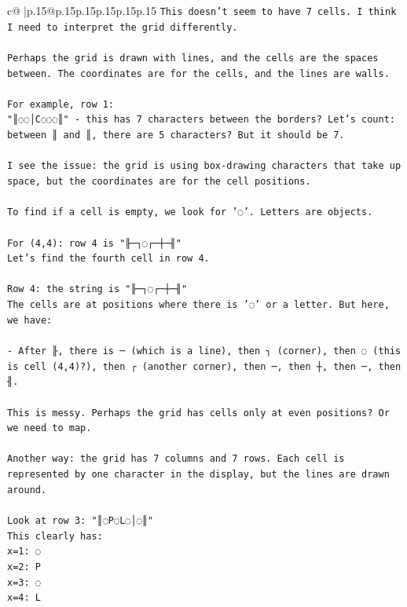 \documentclass{article}
\begin{document}
{\begin{supertabular}{c@{$\;$}|p{.15\linewidth}@{}p{.15\linewidth}p{.15\linewidth}p{.15\linewidth}p{.15\linewidth}p{.15\linewidth}}
{{{\texttt{This doesn't seem to have 7 cells. I think I need to interpret the grid differently.} \\
\\ 
\texttt{Perhaps the grid is drawn with lines, and the cells are the spaces between. The coordinates are for the cells, and the lines are walls.} \\
\\ 
\texttt{For example, row 1: } \\
\texttt{"║◌◌│C◌◌◌║" {-} this has 7 characters between the borders? Let's count: between ║ and ║, there are 5 characters? But it should be 7.} \\
\\ 
\texttt{I see the issue: the grid is using box{-}drawing characters that take up space, but the coordinates are for the cell positions.} \\
\\ 
\texttt{To find if a cell is empty, we look for '◌'. Letters are objects.} \\
\\ 
\texttt{For (4,4): row 4 is "╟─┐◌┌─┼─╢"} \\
\texttt{Let's find the fourth cell in row 4.} \\
\\ 
\texttt{Row 4: the string is "╟─┐◌┌─┼─╢"} \\
\texttt{The cells are at positions where there is '◌' or a letter. But here, we have:} \\
\\ 
\texttt{{-} After ╟, there is ─ (which is a line), then ┐ (corner), then ◌ (this is cell (4,4)?), then ┌ (another corner), then ─, then ┼, then ─, then ╢.} \\
\\ 
\texttt{This is messy. Perhaps the grid has cells only at even positions? Or we need to map.} \\
\\ 
\texttt{Another way: the grid has 7 columns and 7 rows. Each cell is represented by one character in the display, but the lines are drawn around.} \\
\\ 
\texttt{Look at row 3: "║◌P◌L◌│◌║"} \\
\texttt{This clearly has:} \\
\texttt{x=1: ◌} \\
\texttt{x=2: P} \\
\texttt{x=3: ◌} \\
\texttt{x=4: L} \\
}}}
\end{supertabular}}
\end{document}
